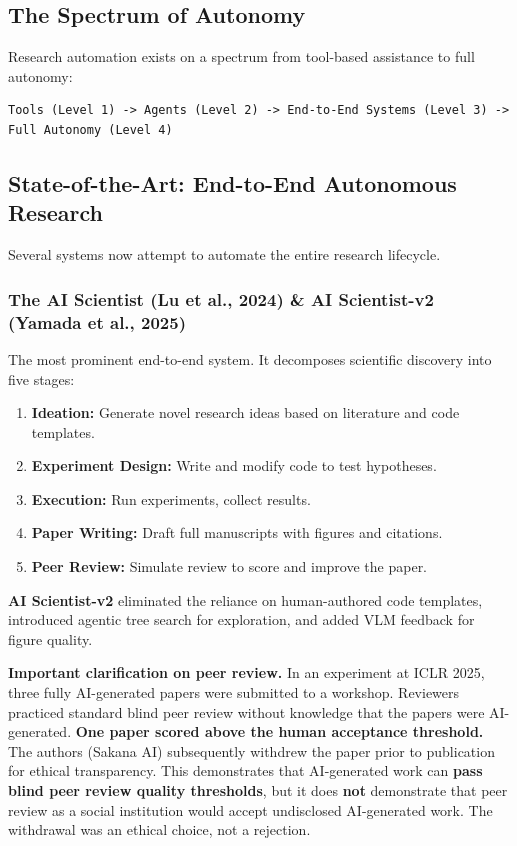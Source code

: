 \documentclass[11pt,a4paper]{article}
\begin{document}
\subsection{The Spectrum of Autonomy}

Research automation exists on a spectrum from tool-based assistance to full autonomy:

\begin{verbatim}
Tools (Level 1) -> Agents (Level 2) -> End-to-End Systems (Level 3) -> Full Autonomy (Level 4)
\end{verbatim}

\subsection{State-of-the-Art: End-to-End Autonomous Research}

Several systems now attempt to automate the entire research lifecycle.

\subsubsection{The AI Scientist (Lu et al., 2024) \& AI Scientist-v2 (Yamada et al., 2025)}

The most prominent end-to-end system. It decomposes scientific discovery into five stages:
\begin{enumerate}[leftmargin=2em]
    \item \textbf{Ideation:} Generate novel research ideas based on literature and code templates.
    \item \textbf{Experiment Design:} Write and modify code to test hypotheses.
    \item \textbf{Execution:} Run experiments, collect results.
    \item \textbf{Paper Writing:} Draft full manuscripts with figures and citations.
    \item \textbf{Peer Review:} Simulate review to score and improve the paper.
\end{enumerate}

\textbf{AI Scientist-v2} eliminated the reliance on human-authored code templates, introduced agentic tree search for exploration, and added VLM feedback for figure quality.

\textbf{Important clarification on peer review.} In an experiment at ICLR 2025, three fully AI-generated papers were submitted to a workshop. Reviewers practiced standard blind peer review without knowledge that the papers were AI-generated. \textbf{One paper scored above the human acceptance threshold.} The authors (Sakana AI) subsequently withdrew the paper prior to publication for ethical transparency. This demonstrates that AI-generated work can \textbf{pass blind peer review quality thresholds}, but it does \textbf{not} demonstrate that peer review as a social institution would accept undisclosed AI-generated work. The withdrawal was an ethical choice, not a rejection.
\end{document}
